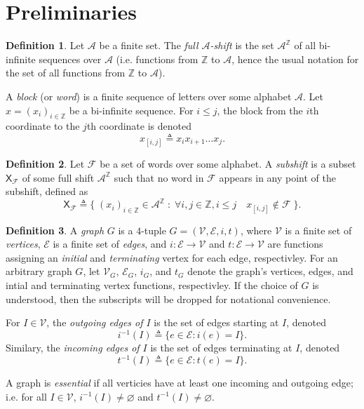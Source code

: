 \documentclass{article}
\title{}
\newcommand{\Ac}{\mathcal{A}}  %
\newcommand{\Vc}{\mathcal{V}}
\newcommand{\Ec}{\mathcal{E}}
\newcommand{\Fc}{\mathcal{F}}
\newcommand{\shift}[1]{\mathsf{X}_{#1}}
\newcommand{\term}[1]{\textit{#1}}
\theoremstyle{definition}
\newtheorem{definition}{Definition}
\begin{document}

\section{Preliminaries}

\begin{definition}
    Let \(\Ac\) be a finite set. The \term{full \(\Ac\)-shift} is the set \(\Ac^\mathbb{Z}\) of all 
    bi-infinite sequences over \(\Ac\) (i.e. functions from \(\mathbb{Z}\) to \(\Ac\), hence the 
    usual notation for the set of all functions from \(\mathbb{Z}\) to \(\Ac\)).
\end{definition}

\noindent A \term{block} (or \term{word}) is a finite sequence of letters over some alphabet \(\Ac\). 
Let \(x=(x_i)_{i \in \mathbb{Z}}\) be a bi-infinite sequence. For \(i \leq j\), the block from the 
\(i\)th coordinate to the \(j\)th coordinate is denoted \[x_{[i,j]} \triangleq x_i x_{i+1} \dots x_{j}.\]

\begin{definition}
    Let \(\Fc\) be a set of words over some alphabet. A \term{subshift} is a subset \(\shift{\Fc}\)
    of some full shift \(\Ac^\mathbb{Z}\) such that no word in \(\Fc\) appears in any point of the subshift,
    defined as
    \[\shift{\Fc} \triangleq \Big\{ \; (x_i)_{i \in \mathbb{Z}} \in \Ac^\mathbb{Z} \; : \; \forall i, j \in \mathbb{Z}, i\leq j \quad  x_{[i,j]} \notin \Fc \; \Big\}.\]
\end{definition}

\begin{definition}
    A \term{graph} \(G\) is a \(4\)-tuple \(G = (\Vc, \Ec, i, t)\), where \(\Vc\) is a finite 
    set of \term{vertices}, \(\Ec\) is a finite set of \term{edges}, and \(i : \Ec \to \Vc\) and 
    \(t : \Ec \to \Vc\) are functions assigning an \term{initial} and \term{terminating} vertex for 
    each edge, respectivley. For an arbitrary graph \(G\), let 
    \(\Vc_G\), \(\Ec_G\), \(i_G\), and \(t_G\) denote the graph's vertices, edges, and 
    intial and terminating vertex functions, respectivley. If the choice 
    of \(G\) is understood, then the subscripts will be dropped for notational convenience.

    For \(I \in \Vc\), the \term{outgoing edges of \(I\)} is the set of edges starting at \(I\),
    denoted 
    \[i^{-1}(I) \triangleq \{e \in \Ec : i(e) = I\}.\]
    Similary, the \term{incoming edges of \(I\)} is the set of edges terminating at \(I\), 
    denoted
    \[t^{-1}(I) \triangleq \{e \in \Ec : t(e) = I\}.\]

    A graph is \term{essential} if all verticies have at least one incoming and outgoing edge;
    i.e. for all \(I \in \Vc\), \(i^{-1}(I) \ne \varnothing\) and \(t^{-1}(I) \ne \varnothing\).

\end{definition}
\end{document}
